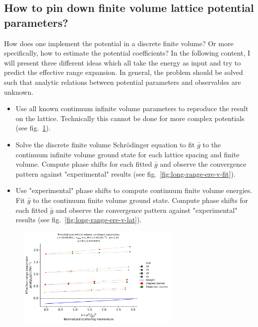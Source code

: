 \documentclass[
    aps,
    prl,
    showkeys,
    nofootinbib,
    floatfix
]{revtex4-1}
\begin{document}
\subsection{How to pin down finite volume lattice potential parameters?}
How does one implement the potential in a discrete finite volume?
Or more specifically, how to estimate the potential coefficients?
In the following content, I will present three different ideas which all take the energy as input and try to predict the effective range expansion.
In general, the problem should be solved such that analytic relations between potential parameters and observables are unknown.

\begin{itemize}
	\item Use all known continuum infinite volume parameters to reproduce the result on the lattice.
		Technically this cannot be done for more complex potentials (see fig.~\ref{fig:long-range-ere-v-inf-cont}). 
	\item Solve the discrete finite volume Schrödinger equation to fit $\bar g$ to the continuum infinite volume ground state for each lattice spacing and finite volume.
		Compute phase shifts for each fitted $\bar g$ and observe the convergence pattern against "experimental" results (see fig.~\ref{fig:long-range-ere-v-fit}).
	\item Use "experimental" phase shifts to compute continuum finite volume energies.
		Fit $\bar g$ to the continuum finite volume ground state.
		Compute phase shifts for each fitted $\bar g$ and observe the convergence pattern against "experimental" results (see fig.~\ref{fig:long-range-ere-v-lat}).
\end{itemize}

\begin{figure}[!htb]
\includegraphics[width=0.7\textwidth]{figs/long-range-ere-v-inf-cont.pdf}
\caption{
	\label{fig:long-range-ere-v-inf-cont}
}
\end{figure}
\end{document}
